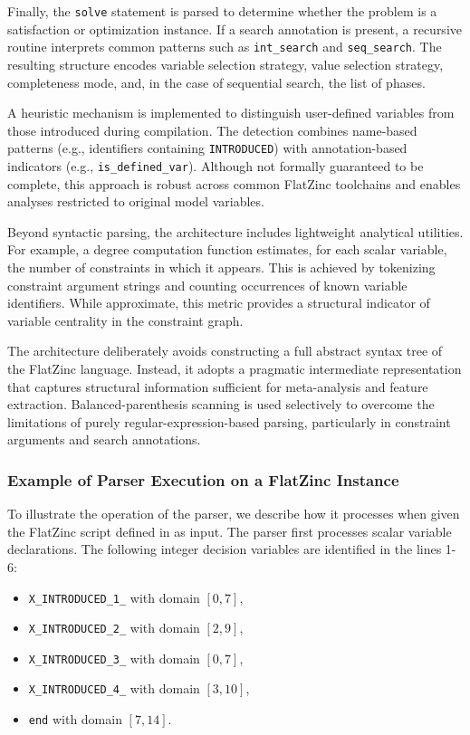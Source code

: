 \documentclass[../../main]{subfiles}
\begin{document}
Finally, the \texttt{solve} statement is parsed to determine whether the problem is a satisfaction or optimization instance. If a search annotation is present, a recursive routine interprets common patterns such as \texttt{int\_search} and \texttt{seq\_search}. The resulting structure encodes variable selection strategy, value selection strategy, completeness mode, and, in the case of sequential search, the list of phases.

A heuristic mechanism is implemented to distinguish user-defined variables from those introduced during compilation. The detection combines name-based patterns (e.g., identifiers containing \texttt{INTRODUCED}) with annotation-based indicators (e.g., \texttt{is\_defined\_var}). Although not formally guaranteed to be complete, this approach is robust across common FlatZinc toolchains and enables analyses restricted to original model variables.

Beyond syntactic parsing, the architecture includes lightweight analytical utilities. For example, a degree computation function estimates, for each scalar variable, the number of constraints in which it appears. This is achieved by tokenizing constraint argument strings and counting occurrences of known variable identifiers. While approximate, this metric provides a structural indicator of variable centrality in the constraint graph.

The architecture deliberately avoids constructing a full abstract syntax tree of the FlatZinc language. Instead, it adopts a pragmatic intermediate representation that captures structural information sufficient for meta-analysis and feature extraction. Balanced-parenthesis scanning is used selectively to overcome the limitations of purely regular-expression-based parsing, particularly in constraint arguments and search annotations.

\subsubsection{Example of Parser Execution on a FlatZinc Instance}
To illustrate the operation of the parser, we describe how it processes when given the FlatZinc script defined in  as input.
The parser first processes scalar variable declarations. The following integer decision variables are identified in the lines 1-6:

\begin{itemize}
\item \texttt{X\_INTRODUCED\_1\_} with domain $[0,7]$,
\item \texttt{X\_INTRODUCED\_2\_} with domain $[2,9]$,
\item \texttt{X\_INTRODUCED\_3\_} with domain $[0,7]$,
\item \texttt{X\_INTRODUCED\_4\_} with domain $[3,10]$,
\item \texttt{end} with domain $[7,14]$.
\end{itemize}
\end{document}
